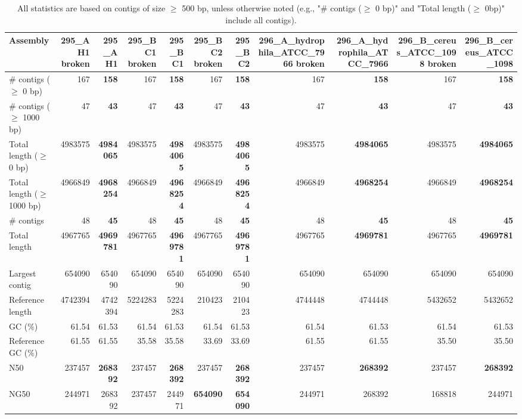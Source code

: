 \documentclass[12pt,a4paper]{article}
\begin{document}
\begin{table}[ht]
\begin{center}
\caption{All statistics are based on contigs of size $\geq$ 500 bp, unless otherwise noted (e.g., "\# contigs ($\geq$ 0 bp)" and "Total length ($\geq$ 0bp)" include all contigs).}
\begin{tabular}{|l*{10}{|r}|}
\hline
Assembly & 295\_AH1 broken & 295\_AH1 & 295\_BC1 broken & 295\_BC1 & 295\_BC2 broken & 295\_BC2 & 296\_A\_hydrophila\_ATCC\_7966 broken & 296\_A\_hydrophila\_ATCC\_7966 & 296\_B\_cereus\_ATCC\_1098 broken & 296\_B\_cereus\_ATCC\_1098 \\ \hline
\# contigs ($\geq$ 0 bp) & 167 & {\bf 158} & 167 & {\bf 158} & 167 & {\bf 158} & 167 & {\bf 158} & 167 & {\bf 158} \\ \hline
\# contigs ($\geq$ 1000 bp) & 47 & {\bf 43} & 47 & {\bf 43} & 47 & {\bf 43} & 47 & {\bf 43} & 47 & {\bf 43} \\ \hline
Total length ($\geq$ 0 bp) & 4983575 & {\bf 4984065} & 4983575 & {\bf 4984065} & 4983575 & {\bf 4984065} & 4983575 & {\bf 4984065} & 4983575 & {\bf 4984065} \\ \hline
Total length ($\geq$ 1000 bp) & 4966849 & {\bf 4968254} & 4966849 & {\bf 4968254} & 4966849 & {\bf 4968254} & 4966849 & {\bf 4968254} & 4966849 & {\bf 4968254} \\ \hline
\# contigs & 48 & {\bf 45} & 48 & {\bf 45} & 48 & {\bf 45} & 48 & {\bf 45} & 48 & {\bf 45} \\ \hline
Total length & 4967765 & {\bf 4969781} & 4967765 & {\bf 4969781} & 4967765 & {\bf 4969781} & 4967765 & {\bf 4969781} & 4967765 & {\bf 4969781} \\ \hline
Largest contig & 654090 & 654090 & 654090 & 654090 & 654090 & 654090 & 654090 & 654090 & 654090 & 654090 \\ \hline
Reference length & 4742394 & 4742394 & 5224283 & 5224283 & 210423 & 210423 & 4744448 & 4744448 & 5432652 & 5432652 \\ \hline
GC (\%) & 61.54 & 61.53 & 61.54 & 61.53 & 61.54 & 61.53 & 61.54 & 61.53 & 61.54 & 61.53 \\ \hline
Reference GC (\%) & 61.55 & 61.55 & 35.58 & 35.58 & 33.69 & 33.69 & 61.55 & 61.55 & 35.50 & 35.50 \\ \hline
N50 & 237457 & {\bf 268392} & 237457 & {\bf 268392} & 237457 & {\bf 268392} & 237457 & {\bf 268392} & 237457 & {\bf 268392} \\ \hline
NG50 & 244971 & 268392 & 237457 & 244971 & {\bf 654090} & {\bf 654090} & 244971 & 268392 & 168818 & 244971 \\ \hline

\end{tabular}
\end{center}
\end{table}
\end{document}
